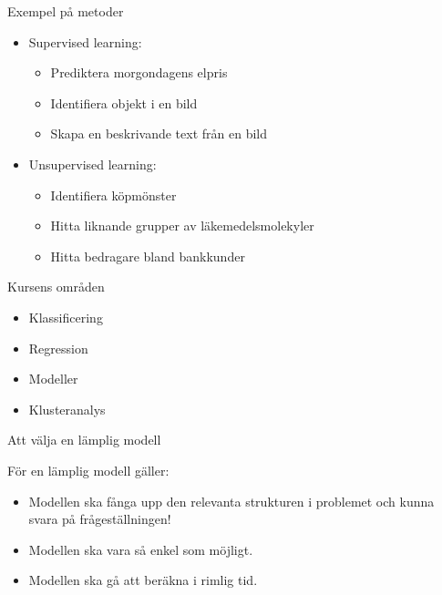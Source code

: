 \documentclass[10pt,english]{beamer}
\begin{document}
\begin{frame}{Exempel på metoder}
    \begin{itemize}
        \item Supervised learning:
        \begin{itemize}
            \item Prediktera morgondagens elpris
            \item Identifiera objekt i en bild
            \item Skapa en beskrivande text från en bild
        \end{itemize}
        \item Unsupervised learning:
        \begin{itemize}
            \item Identifiera köpmönster
            \item Hitta liknande grupper av läkemedelsmolekyler
            \item Hitta bedragare bland bankkunder
        \end{itemize}
    \end{itemize}
\end{frame}

\begin{frame}{Kursens områden}
    \begin{itemize}
        \item Klassificering
        \item Regression
        \item Modeller
        \item Klusteranalys
    \end{itemize}
\end{frame}

\begin{frame}{Att välja en lämplig modell}

    För en lämplig modell gäller:
    \begin{itemize}
        \item Modellen ska fånga upp den relevanta strukturen i problemet och kunna svara på frågeställningen!
        \item Modellen ska vara så enkel som möjligt.
        \item Modellen ska gå att beräkna i rimlig tid.
    \end{itemize}

\end{frame}
\end{document}
